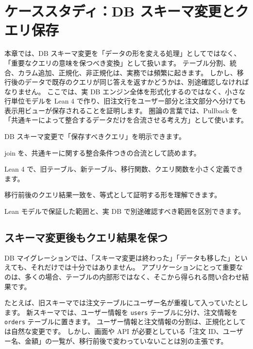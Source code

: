 \chapter{ケーススタディ：DB スキーマ変更とクエリ保存}
\label{chap:db-schema-query-preservation}

\begin{chapterabstract}
本章では、DB スキーマ変更を「データの形を変える処理」としてではなく、「重要なクエリの意味を保つべき変換」として扱います。
テーブル分割、統合、カラム追加、正規化、非正規化は、実務では頻繁に起きます。
しかし、移行後のデータで既存のクエリが同じ答えを返すかどうかは、別途確認しなければなりません。
ここでは、実 DB エンジン全体を形式化するのではなく、小さな行単位モデルを Lean 4 で作り、旧注文行をユーザー部分と注文部分へ分けても表示用ビューが保存されることを証明します。
圏論の言葉では、Pullback を「共通キーによって整合するデータだけを合流させる考え方」として使います。
\end{chapterabstract}

\begin{learninggoals}
\item DB スキーマ変更で「保存すべきクエリ」を明示できます。
\item join を、共通キーに関する整合条件つきの合流として読めます。
\item Lean 4 で、旧テーブル、新テーブル、移行関数、クエリ関数を小さく定義できます。
\item 移行前後のクエリ結果一致を、等式として証明する形を理解できます。
\item Lean モデルで保証した範囲と、実 DB で別途確認すべき範囲を区別できます。
\end{learninggoals}

\section{スキーマ変更後もクエリ結果を保つ}

DB マイグレーションでは、「スキーマ変更は終わった」「データも移した」といえても、それだけでは十分ではありません。
アプリケーションにとって重要なのは、多くの場合、テーブルの内部形ではなく、そこから得られる問い合わせ結果です。

たとえば、旧スキーマでは注文テーブルにユーザー名が重複して入っていたとします。
新スキーマでは、ユーザー情報を \texttt{users} テーブルに分け、注文情報を \texttt{orders} テーブルに置きます。
ユーザー情報と注文情報の分割は、正規化としては自然な変更です。
しかし、画面や API が必要としている「注文 ID、ユーザー名、金額」の一覧が、移行前後で変わっていないことは別の主張です。

